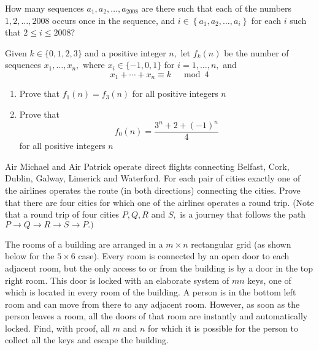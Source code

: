 \documentclass{pset}
\begin{document}
\begin{problems}
\begin{problem}[IrMO 2008 Q4]
    How many sequences \(a_{1}, a_{2}, \ldots, a_{2008}\) are there such that each of the numbers
    \(1,2, \ldots, 2008\) occurs once in the sequence, and \(i \in\left\{a_{1}, a_{2}, \ldots, a_{i}\right\}\) for each \(i\) such that \(2 \leq i \leq 2008 ?\)
\end{problem}

\begin{problem}[IrMO 2008 Q9]
    Given \(k \in\{0,1,2,3\}\) and a positive integer \(n,\) let \(f_{k}(n)\) be the number of sequences \(x_{1}, \ldots, x_{n},\) where \(x_{i} \in\{-1,0,1\}\) for \(i=1, \ldots, n,\) and
    $$
    x_{1}+\cdots+x_{n} \equiv k \quad \bmod 4
    $$
    \begin{enumerate}
    \item Prove that \(f_{1}(n)=f_{3}(n)\) for all positive integers \(n\)
    \item Prove that
    $$
    f_{0}(n)=\frac{3^{n}+2+(-1)^{n}}{4}
    $$
    for all positive integers \(n\)
    \end{enumerate}
\end{problem}

\begin{problem}[IrMO 2007 Q4]
    Air Michael and Air Patrick operate direct flights connecting Belfast, Cork, Dublin, Galway, Limerick and Waterford. For each pair of cities exactly one of the airlines operates the route (in both directions) connecting the cities. Prove that there are four cities for which one of the airlines operates a round trip. (Note that a round trip of four cities \(P, Q, R\) and \(S,\) is a journey that follows the path \(P \rightarrow Q \rightarrow R \rightarrow S \rightarrow P .)\)
\end{problem}


\begin{problem}[IrMO 2006 Q6]
    The rooms of a building are arranged in a \(m \times n\) rectangular grid (as shown below for the \(5 \times 6\) case). Every room is connected by an open door to each adjacent room, but the only access to or from the building is by a door in the top right room. This door is locked with an elaborate system of \(m n\) keys, one of which is located in every room of the building. A person is in the bottom left room and can move from there to any adjacent room. However, as soon as the person leaves a room, all the doors of that room are instantly and automatically locked. Find, with proof, all \(m\) and \(n\) for which it is possible for the person to collect all the keys and escape the building.


\end{problem}
\end{problems}
\end{document}
